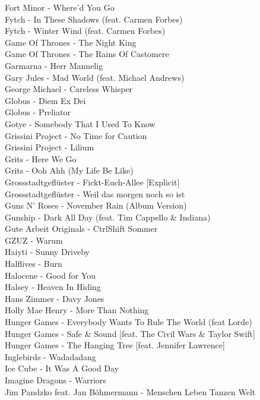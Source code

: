 Fort Minor - Where'd You Go\\
Fytch - In These Shadows (feat. Carmen Forbes)\\
Fytch - Winter Wind (feat. Carmen Forbes)\\
Game Of Thrones - The Night King\\
Game Of Thrones - The Rains Of Castomere\\
Garmarna - Herr Mannelig\\
Gary Jules - Mad World (feat. Michael Andrews)\\
George Michael - Careless Whisper\\
Globus - Diem Ex Dei\\
Globus - Preliator\\
Gotye - Somebody That I Used To Know\\
Grissini Project - No Time for Caution\\
Grissini Project - Lilium\\
Grits - Here We Go\\
Grits - Ooh Ahh (My Life Be Like)\\
Grossstadtgeflüster - Fickt-Euch-Allee [Explicit]\\
Grossstadtgeflüster - Weil das morgen noch so ist\\
Guns N' Roses - November Rain (Album Version)\\
Gunship - Dark All Day (feat. Tim Cappello \& Indiana)\\
Gute Arbeit Originals - CtrlShift Sommer\\
GZUZ - Warum\\
Haiyti - Sunny Driveby\\
Halflives - Burn\\
Halocene - Good for You\\
Halsey - Heaven In Hiding\\
Hans Zimmer - Davy Jones\\
Holly Mae Henry - More Than Nothing\\
Hunger Games - Everybody Wants To Rule The World (feat Lorde)\\
Hunger Games - Safe \& Sound [feat. The Civil Wars \& Taylor Swift]\\
Hunger Games - The Hanging Tree [feat. Jennifer Lawrence]\\
Inglebirds - Wadadadang\\
Ice Cube - It Was A Good Day\\
Imagine Dragons - Warriors\\
Jim Pandzko feat. Jan Böhmermann - Menschen Leben Tanzen Welt\\
